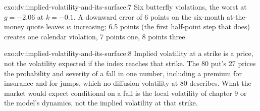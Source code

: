 \begin{solution}{exo:dv:implied-volatility-and-its-surface:7}
Six butterfly violations, the worst at $g=-2.06$ at $k=-0.1$. A downward error of 6 points on
the six-month at-the-money quote leaves $w$ increasing; 6.5 points (the first half-point step
that does) creates one calendar violation, 7 points one, 8 points three.
\end{solution}

\begin{solution}{exo:dv:implied-volatility-and-its-surface:8}
Implied volatility at a strike is a price, not the volatility expected if the index reaches that
strike. The 80 put's 27 prices the probability and severity of a fall in one number, including
a premium for insurance and for jumps, which no diffusion volatility at 80 describes. What the
market would expect conditional on a fall is the local volatility of chapter 9 or the model's
dynamics, not the implied volatility at that strike.
\end{solution}

